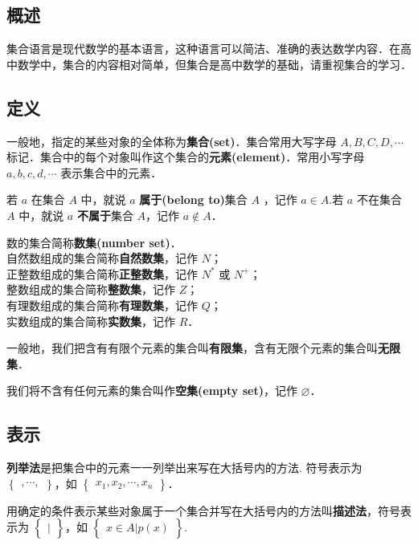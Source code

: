 
\subsection{概述}
集合语言是现代数学的基本语言，这种语言可以简洁、准确的表达数学内容．在高中数学中，集合的内容相对简单，但集合是高中数学的基础，请重视集合的学习．

\subsection{定义}
一般地，指定的某些对象的全体称为\textbf{集合(set)}．集合常用大写字母 $A,B,C,D,\cdots$ 标记．集合中的每个对象叫作这个集合的\textbf{元素(element)}．常用小写字母 $a,b,c,d,\cdots$ 表示集合中的元素．

若 $a$ 在集合 $A$ 中，就说 $a$ \textbf{属于(belong to)}集合 $A$ ，记作 $a \in A$.若 $a$ 不在集合 $A$ 中，就说 $a$ \textbf{不属于}集合 $A$，记作 $a\notin A$．

数的集合简称\textbf{数集(number set)}．\\
自然数组成的集合简称\textbf{自然数集}，记作 $N$；\\
正整数组成的集合简称\textbf{正整数集}，记作 $N^{*}$ 或 $N^{+}$；\\
整数组成的集合简称\textbf{整数集}，记作 $Z$；\\
有理数组成的集合简称\textbf{有理数集}，记作 $Q$；\\
实数组成的集合简称\textbf{实数集}，记作 $R$．

一般地，我们把含有有限个元素的集合叫\textbf{有限集}，含有无限个元素的集合叫\textbf{无限集}．

我们将不含有任何元素的集合叫作\textbf{空集(empty set)}，记作 $\varnothing$．

\subsection{表示}
\textbf{列举法}是把集合中的元素一一列举出来写在大括号内的方法.
符号表示为 $\begin{Bmatrix} ,\cdots, \end{Bmatrix}$，如 $\begin{Bmatrix} x_1,x_2, \cdots ,x_n \end{Bmatrix}$．

用确定的条件表示某些对象属于一个集合并写在大括号内的方法叫\textbf{描述法}，符号表示为 $\begin{Bmatrix} | \end{Bmatrix}$，如 $\begin{Bmatrix} x\in A|p(x) \end{Bmatrix}$.

